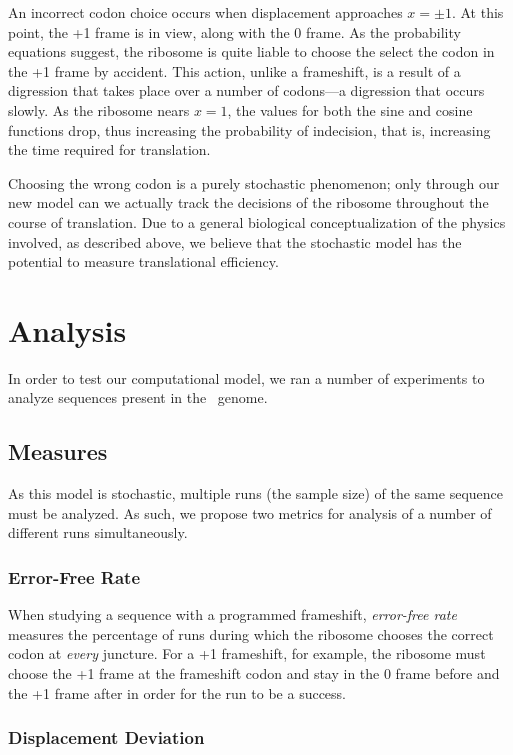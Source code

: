 \documentclass[12pt]{article}
\numberwithin{equation}{section}
\begin{document}
An incorrect codon choice occurs when displacement approaches $x = \pm 1$.
At this point, the +1 frame is in view, along with the 0 frame.  As the probability
equations suggest, the ribosome is quite liable to choose the select the codon
in the +1 frame by accident.  This action, unlike a frameshift, is a result
of a digression that takes place over a number of codons---a digression that
occurs slowly.  As the ribosome nears $x = 1$, the values for both the sine 
and cosine functions drop, thus increasing the probability of indecision, that is,
increasing the time required for translation.

Choosing the wrong codon is a purely stochastic phenomenon; only through our new
model can we actually track the decisions of the ribosome throughout the course
of translation.  Due to a general biological conceptualization of the physics involved,
as described above, we believe that the stochastic model has the potential to 
measure translational efficiency.


\section{Analysis}
In order to test our computational model, we ran a number of
experiments to analyze sequences present in the \ecoli\ genome.

\subsection{Measures}
\label{section:metrics}

As this model is stochastic, multiple runs (the sample size) of the same sequence must be analyzed.
As such, we propose two metrics for analysis of a number of different runs 
simultaneously. 

\subsubsection{Error-Free Rate}
When studying a
sequence with a programmed frameshift, \emph{error-free rate} measures the percentage of runs 
during which the ribosome chooses the correct codon
at \emph{every} juncture.  For a +1 frameshift, for example, the ribosome must
choose the +1 frame at the frameshift codon and stay in the 0 frame before
and the +1 frame after in order for the run to be a success.

\subsubsection{Displacement Deviation}
\label{section:deviation}
\end{document}

